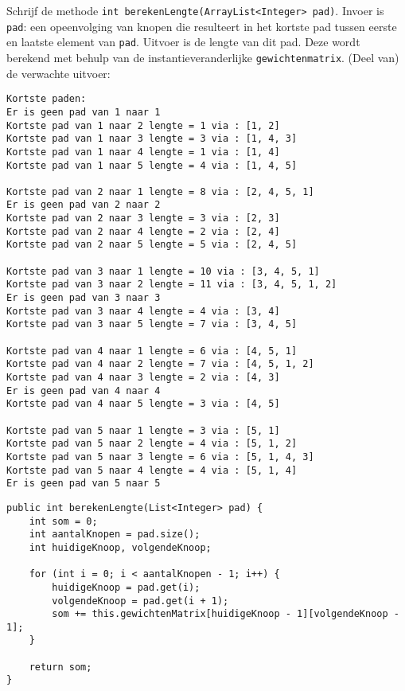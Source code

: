 \begin{oef}
\code Schrijf de methode \verb/int berekenLengte(ArrayList<Integer> pad)/. Invoer is \verb/pad/: een opeenvolging van knopen die resulteert in het kortste pad tussen eerste en laatste element van \verb/pad/. Uitvoer is de lengte van dit pad. Deze wordt berekend met behulp van de instantieveranderlijke \verb/gewichtenmatrix/.
(Deel van) de verwachte uitvoer:
\begin{verbatim}
Kortste paden: 
Er is geen pad van 1 naar 1
Kortste pad van 1 naar 2 lengte = 1 via : [1, 2]
Kortste pad van 1 naar 3 lengte = 3 via : [1, 4, 3]
Kortste pad van 1 naar 4 lengte = 1 via : [1, 4]
Kortste pad van 1 naar 5 lengte = 4 via : [1, 4, 5]

Kortste pad van 2 naar 1 lengte = 8 via : [2, 4, 5, 1]
Er is geen pad van 2 naar 2
Kortste pad van 2 naar 3 lengte = 3 via : [2, 3]
Kortste pad van 2 naar 4 lengte = 2 via : [2, 4]
Kortste pad van 2 naar 5 lengte = 5 via : [2, 4, 5]

Kortste pad van 3 naar 1 lengte = 10 via : [3, 4, 5, 1]
Kortste pad van 3 naar 2 lengte = 11 via : [3, 4, 5, 1, 2]
Er is geen pad van 3 naar 3
Kortste pad van 3 naar 4 lengte = 4 via : [3, 4]
Kortste pad van 3 naar 5 lengte = 7 via : [3, 4, 5]

Kortste pad van 4 naar 1 lengte = 6 via : [4, 5, 1]
Kortste pad van 4 naar 2 lengte = 7 via : [4, 5, 1, 2]
Kortste pad van 4 naar 3 lengte = 2 via : [4, 3]
Er is geen pad van 4 naar 4
Kortste pad van 4 naar 5 lengte = 3 via : [4, 5]

Kortste pad van 5 naar 1 lengte = 3 via : [5, 1]
Kortste pad van 5 naar 2 lengte = 4 via : [5, 1, 2]
Kortste pad van 5 naar 3 lengte = 6 via : [5, 1, 4, 3]
Kortste pad van 5 naar 4 lengte = 4 via : [5, 1, 4]
Er is geen pad van 5 naar 5\end{verbatim}
\begin{opl}
\begin{lstlisting}[caption={berekenLengte}, label=FloydberekenLengte]
public int berekenLengte(List<Integer> pad) {
	int som = 0;
	int aantalKnopen = pad.size();
	int huidigeKnoop, volgendeKnoop;
		
	for (int i = 0; i < aantalKnopen - 1; i++) {
		huidigeKnoop = pad.get(i);
		volgendeKnoop = pad.get(i + 1);
		som += this.gewichtenMatrix[huidigeKnoop - 1][volgendeKnoop - 1];
	}
		
	return som;
}
\end{lstlisting}
\end{opl}

\end{oef}


